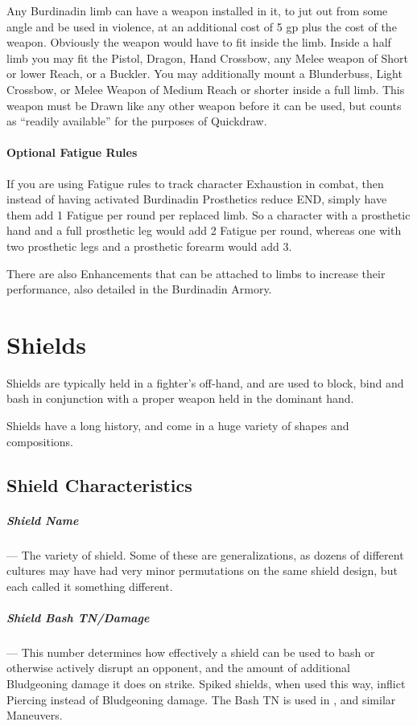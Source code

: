 \documentclass[oneside,11pt,english]{book}
\begin{document}
Any Burdinadin limb can have a weapon installed in it, to jut out from some angle and be used in 
violence, at an additional cost of 5 gp plus the cost of the weapon. Obviously the weapon would have to 
fit inside the limb. Inside a half limb you may fit the Pistol, Dragon, Hand Crossbow, any Melee weapon 
of Short or lower Reach, or a Buckler. You may additionally mount a Blunderbuss, Light Crossbow, or 
Melee Weapon of Medium Reach or shorter inside a full limb. This weapon must be Drawn like any other 
weapon before it can be used, but counts as “readily available” for the purposes of Quickdraw. 

\subsubsection{Optional Fatigue Rules}
If you are using Fatigue rules to track character Exhaustion in combat, then instead of having activated 
Burdinadin Prosthetics reduce END, simply have them add 1 Fatigue per round per replaced limb. So a 
character with a prosthetic hand and a full prosthetic leg would add 2 Fatigue per round, whereas one with 
two prosthetic legs and a prosthetic forearm would add 3. 

There are also Enhancements that can be attached to limbs to increase their performance, also detailed in 
the Burdinadin Armory. 
\chapter{Shields}\label{ch:Shields}
\startcontents[chapters]
\newpage
Shields are typically held in a fighter’s off-hand, and are used to block, bind and bash in conjunction with 
a proper weapon held in the dominant hand. 

Shields have a long history, and come in a huge variety of shapes and compositions.

\section{Shield Characteristics}
\paragraph{Shield Name}---\quad
The variety of shield. Some of these are generalizations, as dozens of different cultures may have had 
very minor permutations on the same shield design, but each called it something different. 


\vspace{-10pt}\paragraph{Shield Bash TN/Damage}---\quad
This number determines how effectively a shield can be used to bash or otherwise
actively disrupt an opponent, and the amount of additional Bludgeoning damage it
does on strike. Spiked shields, when used this way, inflict Piercing instead of
Bludgeoning damage. The Bash TN is used in , and
similar Maneuvers. 
\end{document}
